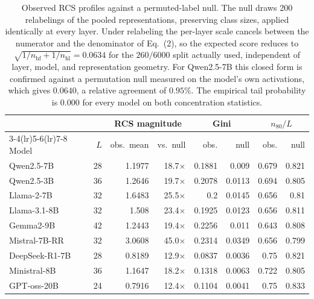 

\begin{table}[t]
\centering\small
\setlength{\tabcolsep}{4pt}
\begin{tabular}{lrrrrrrr}
\toprule
& & \multicolumn{2}{c}{RCS magnitude} & \multicolumn{2}{c}{Gini} & \multicolumn{2}{c}{$n_{80}/L$} \\
\cmidrule(lr){3-4}\cmidrule(lr){5-6}\cmidrule(lr){7-8}
Model & $L$ & obs.\ mean & vs.\ null & obs. & null & obs. & null \\
\midrule
Qwen2.5-7B & 28 & 1.1977 & 18.7$\times$ & 0.1881 & 0.009 & 0.679 & 0.821 \\
Qwen2.5-3B & 36 & 1.2646 & 19.7$\times$ & 0.2078 & 0.0113 & 0.694 & 0.805 \\
Llama-2-7B & 32 & 1.6483 & 25.5$\times$ & 0.2 & 0.0145 & 0.656 & 0.81 \\
Llama-3.1-8B & 32 & 1.508 & 23.4$\times$ & 0.1925 & 0.0123 & 0.656 & 0.811 \\
Gemma2-9B & 42 & 1.2443 & 19.4$\times$ & 0.2256 & 0.011 & 0.643 & 0.808 \\
Mistral-7B-RR & 32 & 3.0608 & 45.0$\times$ & 0.2314 & 0.0349 & 0.656 & 0.799 \\
DeepSeek-R1-7B & 28 & 0.8189 & 12.9$\times$ & 0.0837 & 0.0036 & 0.75 & 0.821 \\
Ministral-8B & 36 & 1.1647 & 18.2$\times$ & 0.1318 & 0.0063 & 0.722 & 0.805 \\
GPT-oss-20B & 24 & 0.7916 & 12.4$\times$ & 0.1104 & 0.0041 & 0.75 & 0.833 \\
\bottomrule
\end{tabular}
\caption{Observed RCS profiles against a permuted-label null. The null draws 200 relabelings
of the pooled representations, preserving class sizes, applied identically at every layer.
Under relabeling the per-layer scale cancels between the numerator and the denominator of
Eq.~(2), so the expected score reduces to $\sqrt{1/n_{\mathrm{hf}}+1/n_{\mathrm{hl}}}=0.0634$
for the $260/6000$ split actually used, independent of layer, model, and representation
geometry. For Qwen2.5-7B this closed form is confirmed against a permutation null measured on
the model's own activations, which gives $0.0640$, a relative agreement of $0.95\%$. The
empirical tail probability is $0.000$ for every model on both concentration statistics.}
\label{tab:permutation-null}
\end{table}

